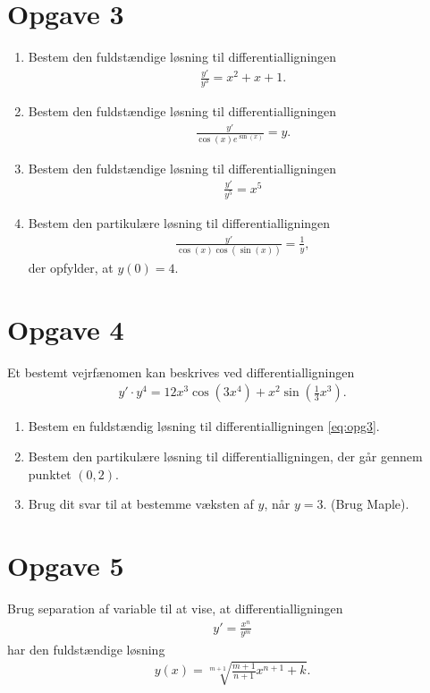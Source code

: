 \section*{Opgave 3}
\begin{enumerate}[label=\roman*)]
	\item Bestem den fuldstændige løsning til differentialligningen
	\begin{align*}
		\frac{y'}{y^3} = x^2+x+1.
	\end{align*}
	\item Bestem den fuldstændige løsning til differentialligningen
	\begin{align*}
		\frac{y'}{\cos(x)e^{\sin(x)}} = y.
	\end{align*}
	\item Bestem den fuldstændige løsning til differentialligningen
	\begin{align*}
		\frac{y'}{y^5} = x^5
	\end{align*}
	\item Bestem den partikulære løsning til differentialligningen
	\begin{align*}
		\frac{y'}{\cos(x)\cos(\sin(x))} = \frac{1}{y},
	\end{align*}
	der opfylder, at $y(0)=4$.
\end{enumerate}

\section*{Opgave 4}
Et bestemt vejrfænomen kan beskrives ved differentialligningen
\begin{align}\label{eq:opg3}
	y'\cdot y^4 = 12x^3\cos(3x^4) + x^2\sin\left(\frac{1}{3}x^3\right).
\end{align}
\begin{enumerate}[label=\roman*)]
	\item Bestem en fuldstændig løsning til differentialligningen \eqref{eq:opg3}.
	\item Bestem den partikulære løsning til differentialligningen, der går gennem punktet $(0,2)$.
	\item Brug dit svar til at bestemme væksten af $y$, når $y = 3$. (Brug Maple).
\end{enumerate}

\section*{Opgave 5}
Brug separation af variable til at vise, at differentialligningen
\begin{align*}
	y' = \frac{x^n}{y^m}
\end{align*}
har den fuldstændige løsning
\begin{align*}
	y(x) = \sqrt[m+1]{\frac{m+1}{n+1}x^{n+1}+k}.
\end{align*}